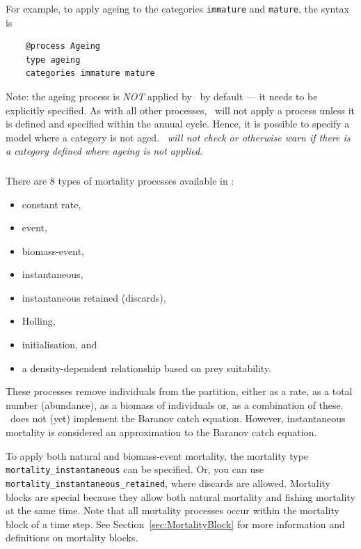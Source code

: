 For example, to apply ageing to the categories \texttt{immature} and \texttt{mature}, the syntax is

{\small{\begin{verbatim}
	@process Ageing
	type ageing
	categories immature mature
	\end{verbatim}}}

Note: the ageing process is \emph{NOT} applied by \CNAME\ by default --- it needs to be explicitly specified. As with all other processes, \CNAME\ will not apply a process unless it is defined and specified within the annual cycle. Hence, it is possible to specify a model where a category is not aged. \emph{\CNAME\ will not check or otherwise warn if there is a category defined where ageing is not applied.}

\subsubsection{\label{sec:Process-Mortality}}

There are 8 types of mortality processes available in \CNAME:

\begin{itemize}
	\item constant rate,
	\item event,
	\item biomass-event,
	\item instantaneous,
	\item instantaneous retained (discards),
	\item Holling,
	\item initialisation, and
	\item a density-dependent relationship based on prey suitability.
\end{itemize}

These processes remove individuals from the partition, either as a rate, as a total number (abundance), as a biomass of individuals or, as a combination of these. \CNAME\ does not (yet) implement the Baranov catch equation. However, instantaneous mortality is considered an approximation to the Baranov catch equation.

To apply both natural and biomass-event mortality, the mortality type \texttt{mortality\_instantaneous} can be specified. Or, you can use \texttt{mortality\_instantaneous\_retained}, where discards are allowed. Mortality blocks are special because they allow both natural mortality and fishing mortality at the same time. Note that all mortality processes occur within the mortality block of a time step. See Section~\ref{sec:MortalityBlock} for more information and definitions on mortality blocks.


